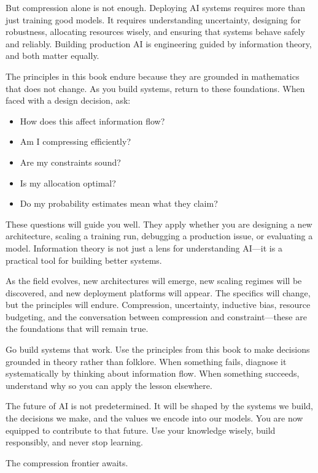 But compression alone is not enough. Deploying AI systems requires more than just training good models. It requires understanding uncertainty, designing for robustness, allocating resources wisely, and ensuring that systems behave safely and reliably. Building production AI is engineering guided by information theory, and both matter equally.

The principles in this book endure because they are grounded in mathematics that does not change. As you build systems, return to these foundations. When faced with a design decision, ask:

\begin{itemize}
\item How does this affect information flow?
\item Am I compressing efficiently?
\item Are my constraints sound?
\item Is my allocation optimal?
\item Do my probability estimates mean what they claim?
\end{itemize}

These questions will guide you well. They apply whether you are designing a new architecture, scaling a training run, debugging a production issue, or evaluating a model. Information theory is not just a lens for understanding AI---it is a practical tool for building better systems.

As the field evolves, new architectures will emerge, new scaling regimes will be discovered, and new deployment platforms will appear. The specifics will change, but the principles will endure. Compression, uncertainty, inductive bias, resource budgeting, and the conversation between compression and constraint---these are the foundations that will remain true.

Go build systems that work. Use the principles from this book to make decisions grounded in theory rather than folklore. When something fails, diagnose it systematically by thinking about information flow. When something succeeds, understand why so you can apply the lesson elsewhere.

The future of AI is not predetermined. It will be shaped by the systems we build, the decisions we make, and the values we encode into our models. You are now equipped to contribute to that future. Use your knowledge wisely, build responsibly, and never stop learning.

The compression frontier awaits.


